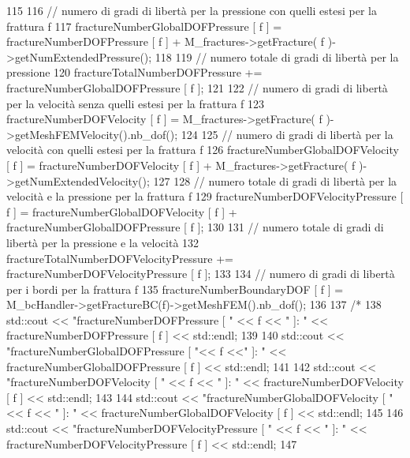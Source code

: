 \begin{DoxyCode}
115         
116         \textcolor{comment}{// numero di gradi di libertà per la pressione con quelli estesi per la frattura f}
117         fractureNumberGlobalDOFPressure [ f ] = fractureNumberDOFPressure [ f ] + M\_fractures->getFracture(
       f )->getNumExtendedPressure();
118 
119         \textcolor{comment}{// numero totale di gradi di libertà per la pressione}
120         fractureTotalNumberDOFPressure += fractureNumberGlobalDOFPressure [ f ];
121 
122         \textcolor{comment}{// numero di gradi di libertà per la velocità senza quelli estesi per la frattura f}
123         fractureNumberDOFVelocity [ f ] = M\_fractures->getFracture( f )->getMeshFEMVelocity().nb\_dof();
124 
125         \textcolor{comment}{// numero di gradi di libertà per la velocità con quelli estesi per la frattura f}
126         fractureNumberGlobalDOFVelocity [ f ] = fractureNumberDOFVelocity [ f ] + M\_fractures->getFracture(
       f )->getNumExtendedVelocity();
127 
128         \textcolor{comment}{// numero totale di gradi di libertà per la velocità e la pressione per la frattura f}
129         fractureNumberDOFVelocityPressure [ f ] = fractureNumberGlobalDOFVelocity [ f ] + 
      fractureNumberGlobalDOFPressure [ f ];
130 
131         \textcolor{comment}{// numero totale di gradi di libertà per la pressione e la velocità}
132         fractureTotalNumberDOFVelocityPressure += fractureNumberDOFVelocityPressure [ f ];
133 
134         \textcolor{comment}{// numero di gradi di libertà per i bordi per la frattura f}
135         fractureNumberBoundaryDOF [ f ] = M\_bcHandler->getFractureBC(f)->getMeshFEM().nb\_dof();
136 
137      \textcolor{comment}{/*   }
138 \textcolor{comment}{        std::cout << "fractureNumberDOFPressure [ " << f << " ]:  " << fractureNumberDOFPressure [ f ] <<
       std::endl;}
139 \textcolor{comment}{        }
140 \textcolor{comment}{        std::cout << "fractureNumberGlobalDOFPressure [ "<< f <<" ]:  " << fractureNumberGlobalDOFPressure
       [ f ] << std::endl;}
141 \textcolor{comment}{        }
142 \textcolor{comment}{        std::cout << "fractureNumberDOFVelocity [ " << f << " ]:  " << fractureNumberDOFVelocity [ f ] <<
       std::endl;}
143 \textcolor{comment}{        }
144 \textcolor{comment}{        std::cout << "fractureNumberGlobalDOFVelocity [ " << f << " ]:  " <<
       fractureNumberGlobalDOFVelocity [ f ] << std::endl;}
145 \textcolor{comment}{        }
146 \textcolor{comment}{        std::cout << "fractureNumberDOFVelocityPressure [ " << f << " ]:  " <<
       fractureNumberDOFVelocityPressure [ f ] << std::endl;}
147 \textcolor{comment}{        }

\end{DoxyCode}

